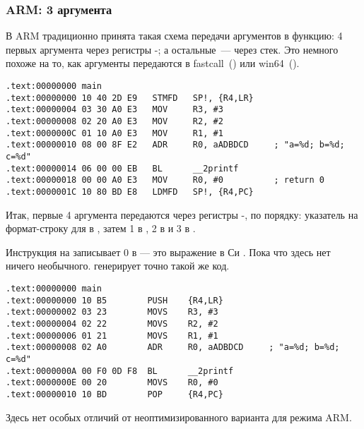 \subsubsection{ARM: 3 аргумента}

В ARM традиционно принята такая схема передачи аргументов в функцию: 
4 первых аргумента через регистры -; а остальные~--- через стек.
Это немного похоже на то, как аргументы передаются в 
fastcall~() или win64~().


\mysubparagraph{\NonOptimizingKeilVI (\ARMMode)}

\begin{lstlisting}[caption=\NonOptimizingKeilVI (\ARMMode)]
.text:00000000 main
.text:00000000 10 40 2D E9   STMFD   SP!, {R4,LR}
.text:00000004 03 30 A0 E3   MOV     R3, #3
.text:00000008 02 20 A0 E3   MOV     R2, #2
.text:0000000C 01 10 A0 E3   MOV     R1, #1
.text:00000010 08 00 8F E2   ADR     R0, aADBDCD     ; "a=%d; b=%d; c=%d"
.text:00000014 06 00 00 EB   BL      __2printf
.text:00000018 00 00 A0 E3   MOV     R0, #0          ; return 0
.text:0000001C 10 80 BD E8   LDMFD   SP!, {R4,PC}
\end{lstlisting}

Итак, первые 4 аргумента передаются через регистры -, по порядку: 
указатель на формат-строку для \printf
в , затем 1 в , 2 в  и 3 в .

Инструкция на  записывает 0 в  --- это выражение в Си .
Пока что здесь нет ничего необычного.
\OptimizingKeilVI генерирует точно такой же код.

\mysubparagraph{\OptimizingKeilVI (\ThumbMode)}

\begin{lstlisting}[caption=\OptimizingKeilVI (\ThumbMode)]
.text:00000000 main
.text:00000000 10 B5        PUSH    {R4,LR}
.text:00000002 03 23        MOVS    R3, #3
.text:00000004 02 22        MOVS    R2, #2
.text:00000006 01 21        MOVS    R1, #1
.text:00000008 02 A0        ADR     R0, aADBDCD     ; "a=%d; b=%d; c=%d"
.text:0000000A 00 F0 0D F8  BL      __2printf
.text:0000000E 00 20        MOVS    R0, #0
.text:00000010 10 BD        POP     {R4,PC}
\end{lstlisting}

Здесь нет особых отличий от неоптимизированного варианта для режима ARM.
\label{ARM_B_to_printf}


